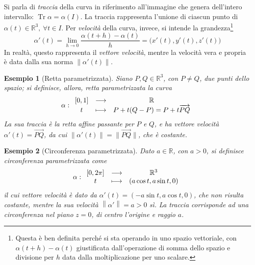 \documentclass[12pt]{scrartcl}
\theoremstyle{style}
\newtheorem{esempio}{Esempio}[section]
\numberwithin{equation}{subsection}
\begin{document}
Si parla di \textit{traccia} della curva in riferimento all'immagine che genera dell'intero intervallo: $\operatorname{Tr} \alpha  = \alpha (I)$.
La traccia rappresenta l'unione di ciascun punto di $\alpha (t) \in \mathbb{R}^3, \ \forall t \in I$.
Per \textit{velocit\`a} della curva, invece, si intende la grandezza\footnote{Questa \`e ben definita perch\'e si sta operando in uno spazio vettoriale, con $\alpha (t+h) - \alpha (t)$ giustificata dall'operazione di somma dello spazio e divisione per $h$ data dalla moltiplicazione per uno scalare.}
\begin{equation}
	\alpha '(t) = \lim_{h \to 0} \frac{\alpha (t + h) - \alpha (t)}{h} = \big(x'(t),y'(t),z'(t)\big)
\end{equation}
In realt\`a, questo rappresenta il \textit{vettore velocit\`a}, mentre la velocit\`a vera e propria \`e data dalla sua norma $\left\lVert \alpha' (t) \right\rVert $.
\begin{esempio}
	[Retta parametrizzata]
	Siano $P,Q \in \mathbb{R}^3$, con $P\neq Q$, due punti dello spazio; si definisce, allora, \textit{retta parametrizzata} la curva 
	\[
		\alpha :
		\begin{array}
			{c c c}
			[0,1] &\longrightarrow & \mathbb{R}\\
			t &\longmapsto & P + t(Q-P) = P+t \overrightarrow{PQ}
		\end{array}
	\] 
La sua traccia \`e la retta affine passante per $P$ e $Q$, e ha vettore velocit\`a $\alpha '(t) = \overrightarrow{PQ}$, da cui $\left\lVert \alpha '(t) \right\rVert = \lVert \overrightarrow{PQ} \rVert$, che \`e costante.
\end{esempio}
\begin{esempio}
	[Circonferenza parametrizzata]
Dato $a\in \mathbb{R}$, con $a > 0$, si definisce \textit{circonferenza parametrizzata} come 
\[
\alpha:
	\begin{array}
		{c c c}
		[0,2\pi] &\longrightarrow & \mathbb{R}^3\\
		t &\longmapsto & (a \cos t, a \sin t , 0)
	\end{array}
\] 
il cui vettore velocit\`a \`e dato da $\alpha '(t) = (-a\sin t, a \cos t, 0)$, che non risulta costante, mentre la sua velocit\`a $\left\lVert \alpha ' \right\rVert = a >0$ s\`i.
La traccia corrisponde ad una circonferenza nel piano $z=0$, di centro l'origine e raggio $a$.
\end{esempio}
\end{document}
